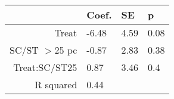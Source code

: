 \begin{tabular}{rlll}
  \hline
 & Coef. & SE & p \\ 
  \hline
Treat & -6.48 & 4.59 & 0.08 \\ 
  SC/ST $>$25 pc & -0.87 & 2.83 & 0.38 \\ 
  Treat:SC/ST25 & 0.87 & 3.46 & 0.4 \\ 
  R squared & 0.44 &  &  \\ 
   \hline
\end{tabular}


